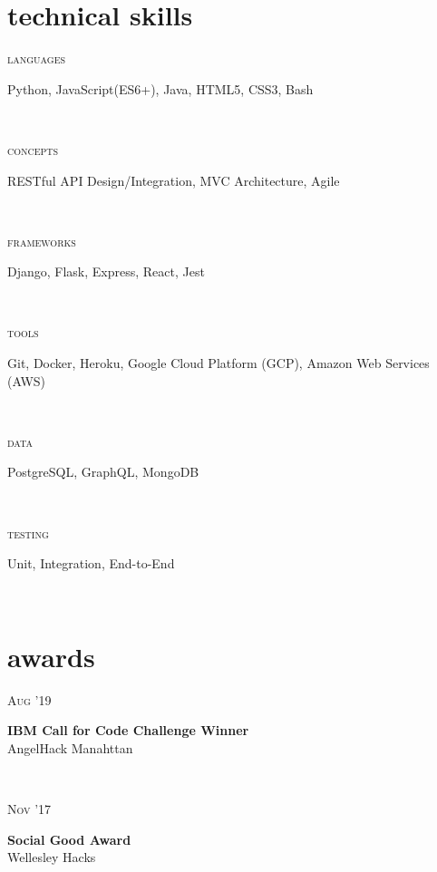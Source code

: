 \documentclass[letterpaper, 10.5pt]{article}
\newcommand{\projectentry}[4]{
    \begin{minipage}[t]{.15\linewidth}
    \hfill \textsc{#1}
    \end{minipage}
    \hfill\vline\hfill
    \begin{minipage}[t]{.80\linewidth}
    {\bf#2}
    \\ #3 
    \vspace{-1.0mm}
    \small{#4}
    \end{minipage}\\
    \vspace{.125cm}
    }
\newcommand{\skillentry}[2]{
    \begin{minipage}[t]{.15\linewidth}
        \hfill \textsc{#1}
        \end{minipage}
        \hfill\vline\hfill
        \begin{minipage}[t]{.80\linewidth}
        #2
        \end{minipage}\\
    }
\begin{document}
    \section{technical skills}

    \skillentry{languages}{Python, JavaScript(ES6+), Java, HTML5, CSS3, Bash}
    \skillentry{concepts}{RESTful API Design/Integration, MVC Architecture, Agile}
    \skillentry{frameworks}{Django, Flask, Express, React, Jest}
    \skillentry{tools}{Git, Docker, Heroku, Google Cloud Platform (GCP), Amazon Web Services (AWS) }
    \skillentry{data}{PostgreSQL, GraphQL, MongoDB}
    \skillentry{testing}{Unit, Integration, End-to-End}


    \section{awards}
    \projectentry{Aug '19}
    {IBM Call for Code Challenge Winner}
    {AngelHack Manahttan}
    {    }

    \projectentry{Nov '17}
    {Social Good Award}
    {Wellesley Hacks}
    {    }
\end{document}
